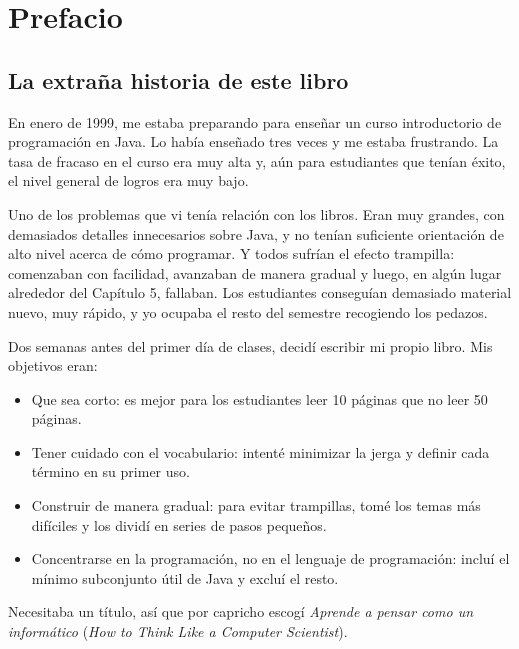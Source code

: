 \documentclass[10pt]{book}
\begin{document}
\fi


\chapter{Prefacio}

\section*{La extraña historia de este libro}

En enero de 1999, me estaba preparando para enseñar un curso introductorio
de programación en Java.  Lo había enseñado tres veces y me estaba frustrando.
La tasa de fracaso en el curso era muy alta y, aún para estudiantes que
tenían éxito, el nivel general de logros era muy bajo.

Uno de los problemas que vi tenía relación con los libros.
Eran muy grandes, con demasiados detalles innecesarios sobre Java, y
no tenían suficiente orientación de alto nivel acerca de cómo programar.  Y todos
sufrían el efecto trampilla: comenzaban con facilidad,
avanzaban de manera gradual y luego, en algún lugar alrededor del Capítulo 5,
fallaban.  Los estudiantes conseguían demasiado material nuevo,
muy rápido, y yo ocupaba el resto del semestre recogiendo los pedazos.

Dos semanas antes del primer día de clases, decidí escribir mi propio libro.
Mis objetivos eran:

\begin{itemize}

\item Que sea corto: es mejor para los estudiantes leer 10 páginas que
no leer 50 páginas.

\item Tener cuidado con el vocabulario: intenté minimizar la jerga y
definir cada término en su primer uso.

\item Construir de manera gradual: para evitar trampillas, tomé los temas más difíciles
y los dividí en series de pasos pequeños.

\item Concentrarse en la programación, no en el lenguaje de programación: incluí
el mínimo subconjunto útil de Java y excluí el resto.

\end{itemize}

Necesitaba un título, así que por capricho escogí {\em Aprende a pensar como
un informático} ({\em How to Think Like a Computer Scientist}).
\end{document}
